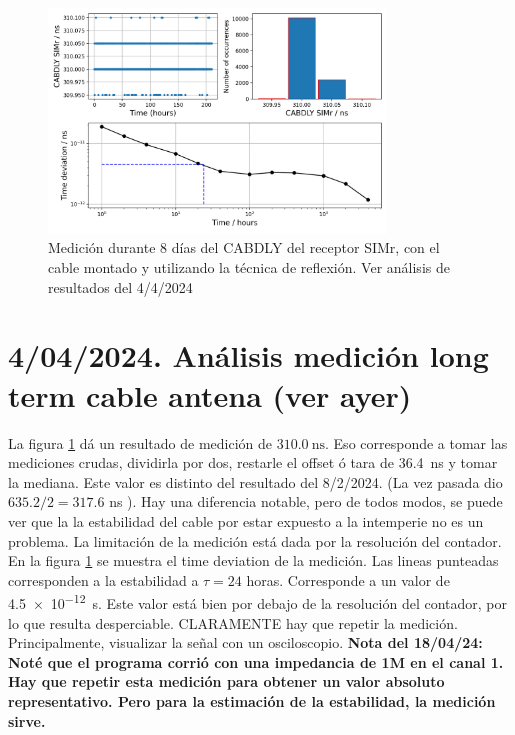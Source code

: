 \documentclass[11pt]{article}
\begin{document}
\begin{figure}[ht]
    \begin{center}
        \includegraphics[width=0.8\textwidth]{./figuras/antenadelaySIMr.png}
        \caption{Medición durante 8 días del CABDLY del receptor SIMr, con el cable montado y utilizando la técnica de reflexión. Ver análisis de resultados del 4/4/2024 }
        \label{fig:antenadelaySIMr}
    \end{center}
\end{figure}

\section{4/04/2024. Análisis medición long term cable antena (ver ayer)}
La figura \ref{fig:antenadelaySIMr} dá un resultado de medición de $\boxed{\SI{310.0}{\nano\second}}$. Eso corresponde a tomar las mediciones crudas, dividirla por dos, restarle el offset ó tara de \SI{36.4}{\nano\second} y tomar la mediana.
Este valor es distinto del resultado del 8/2/2024. (La vez pasada dio $635.2/2 = 317.6$ ns ). Hay una diferencia notable, pero de todos modos, se puede ver que la la estabilidad del cable por estar expuesto a la intemperie no es un problema. La limitación de la medición está dada por la resolución del contador. En la figura \ref{fig:antenadelaySIMr} se muestra el time deviation de la medición. Las lineas punteadas corresponden a la estabilidad a $\tau = 24$ horas. Corresponde a un valor de \SI{4.5e-12}{\second}. Este valor está bien por debajo de la resolución del contador, por lo que resulta desperciable.
CLARAMENTE hay que repetir la medición. Principalmente, visualizar la señal con un osciloscopio. 
\textbf{Nota del 18/04/24: Noté que el programa corrió con una impedancia de 1M en el canal 1. Hay que repetir esta medición para obtener un valor absoluto representativo. Pero para la estimación de la estabilidad, la medición sirve.}
\end{document}
